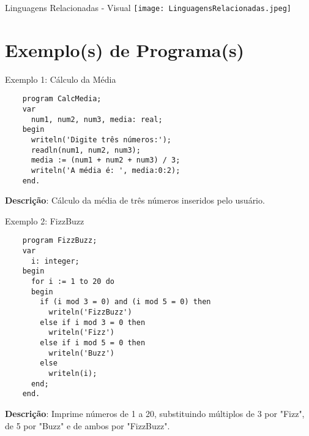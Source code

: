 \documentclass{beamer}
\begin{document}
\begin{frame}{Linguagens Relacionadas - Visual}
    \centering
    \texttt{[image: LinguagensRelacionadas.jpeg]}
\end{frame}

\section{Exemplo(s) de Programa(s)}
\begin{frame}[fragile]{Exemplo 1: Cálculo da Média}
    \footnotesize
    \begin{lstlisting}
    program CalcMedia;
    var
      num1, num2, num3, media: real;
    begin
      writeln('Digite três números:');
      readln(num1, num2, num3);
      media := (num1 + num2 + num3) / 3;
      writeln('A média é: ', media:0:2);
    end.
    \end{lstlisting}
    \vfill
    \textbf{Descrição}: Cálculo da média de três números inseridos pelo usuário.
\end{frame}

\begin{frame}[fragile]{Exemplo 2: FizzBuzz}
    \footnotesize
    \begin{lstlisting}
    program FizzBuzz;
    var
      i: integer;
    begin
      for i := 1 to 20 do
      begin
        if (i mod 3 = 0) and (i mod 5 = 0) then
          writeln('FizzBuzz')
        else if i mod 3 = 0 then
          writeln('Fizz')
        else if i mod 5 = 0 then
          writeln('Buzz')
        else
          writeln(i);
      end;
    end.
\end{lstlisting}
\textbf{Descrição}: Imprime números de 1 a 20, substituindo múltiplos de 3 por "Fizz", de 5 por "Buzz" e de ambos por "FizzBuzz".
\end{frame}
\end{document}
